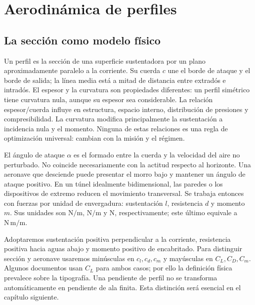 \chapter{Aerodinámica de perfiles}\label{ch:09}

\section{La sección como modelo físico}
Un perfil es la sección de una superficie sustentadora por un plano aproximadamente paralelo a la corriente. Su cuerda $c$ une el borde de ataque y el borde de salida; la línea media está a mitad de distancia entre extradós e intradós. El espesor y la curvatura son propiedades diferentes: un perfil simétrico tiene curvatura nula, aunque su espesor sea considerable. La relación espesor/cuerda influye en estructura, espacio interno, distribución de presiones y compresibilidad. La curvatura modifica principalmente la sustentación a incidencia nula y el momento. Ninguna de estas relaciones es una regla de optimización universal: cambian con la misión y el régimen.

El ángulo de ataque $\alpha$ es el formado entre la cuerda y la velocidad del aire no perturbado. No coincide necesariamente con la actitud respecto al horizonte. Una aeronave que desciende puede presentar el morro bajo y mantener un ángulo de ataque positivo. En un túnel idealmente bidimensional, las paredes o los dispositivos de extremo reducen el movimiento transversal. Se trabaja entonces con fuerzas por unidad de envergadura: sustentación $l$, resistencia $d$ y momento $m$. Sus unidades son $\mathrm{N/m}$, $\mathrm{N/m}$ y $\mathrm{N}$, respectivamente; este último equivale a $\mathrm{N\,m/m}$.

Adoptaremos sustentación positiva perpendicular a la corriente, resistencia positiva hacia aguas abajo y momento positivo de encabritado. Para distinguir sección y aeronave usaremos minúsculas en $c_l,c_d,c_m$ y mayúsculas en $C_L,C_D,C_m$. Algunos documentos usan $C_L$ para ambos casos; por ello la definición física prevalece sobre la tipografía. Una pendiente de perfil no se transforma automáticamente en pendiente de ala finita. Esta distinción será esencial en el capítulo siguiente.

